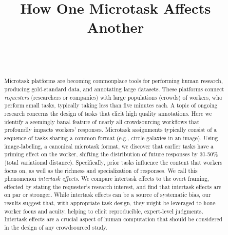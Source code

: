\documentclass{sigchi}
\begin{document}
\title{How One Microtask Affects Another}

\author{%
  \\
  \\
}

\maketitle

\begin{abstract}
Microtask platforms are becoming commonplace tools for performing human
research, producing gold-standard data, and annotating large datasets.
These platforms connect \textit{requesters}
(researchers or companies) with large populations (crowds) of workers, who 
perform small tasks, typically taking less than five minutes each.
A topic of ongoing research concerns the design of tasks that elicit high
quality annotations.
Here we identify a seemingly banal feature of nearly all crowdsourcing 
workflows that profoundly impacts workers' responses.
Microtask assignments typically consist of a sequence 
of tasks sharing a common format (e.g., circle galaxies in an image). 
Using image-labeling, a canonical microtask format, we 
discover that earlier tasks have a priming effect on the worker, shifting 
the distribution of future responses by 30-50\% 
(total variational distance). 
Specifically, prior tasks influence the content that workers focus on, 
as well as the richness and specialization of responses. 
We call this phenomenon \textit{intertask effects}.
We compare intertask effects to the overt framing, 
effected by stating the requester's research interest, 
and find that intertask effects are on par or stronger.
While intertask effects can be a source of systematic bias, 
our results suggest that, with appropriate task design, 
they might be leveraged to hone worker focus and acuity, 
helping to elicit reproducible, expert-level judgments.
Intertask effects are a crucial aspect of human computation that should be
considered in the design of any crowdsourced study.
\end{abstract}
\end{document}
